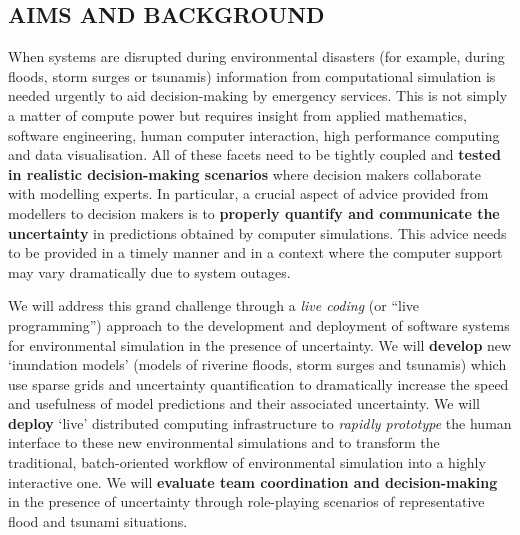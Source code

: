 \subsection*{AIMS AND BACKGROUND}

When systems are disrupted during environmental disasters (for example,
during floods, storm surges or tsunamis) information from
computational simulation is needed urgently to aid decision-making by
emergency services. This is not simply a matter of compute power but
requires insight from applied mathematics, software
engineering, human computer interaction, high performance computing
and data visualisation. All of these facets need to be tightly coupled
and {\bf tested in realistic  decision-making
scenarios} where decision makers collaborate with modelling experts. In
particular, a crucial aspect of advice provided from modellers to
decision makers is to {\bf properly quantify and communicate the
{uncertainty}} in predictions obtained by computer simulations.
This advice needs to be provided in a timely manner and in a context
where the computer support may vary dramatically due to
system outages.

We will address this grand challenge through a \emph{live coding} (or ``live programming'')
approach to the development and deployment of software systems for
environmental simulation in the presence of uncertainty. We will
\textbf{develop} new `inundation models' (models of riverine floods,
storm surges and tsunamis) which use sparse grids and uncertainty
quantification to dramatically increase the speed and usefulness of
model predictions and their associated uncertainty. We will
\textbf{deploy} `live' distributed computing infrastructure to
\emph{rapidly prototype} the human interface to these new
environmental simulations and to transform the traditional,
batch-oriented workflow of environmental simulation into a highly
interactive one. 
We will \textbf{evaluate team coordination and
decision-making} in the presence of uncertainty through role-playing
scenarios of representative flood and tsunami situations. 


